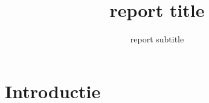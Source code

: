 \documentclass{deltares_manual}
\begin{document}
\title{report title}
\subtitle{report subtitle}

\deltarestitle

\chapter{Introductie}
\end{document}
